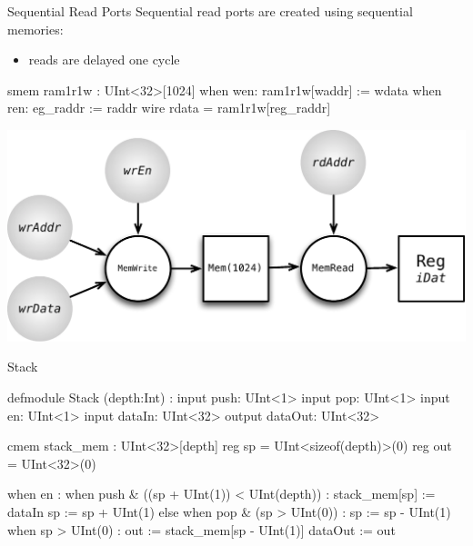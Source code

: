 \documentclass[xcolor=pdflatex,dvipsnames,table]{beamer}
\begin{document}
\begin{frame}[fragile]{Sequential Read Ports}
Sequential read ports are created using sequential memories:
\begin{itemize}
\item reads are delayed one cycle
\end{itemize}

\begin{stanza}
smem ram1r1w : UInt<32>[1024]
when wen: ram1r1w[waddr] := wdata
when ren: eg_raddr := raddr
wire rdata = ram1r1w[reg_raddr]
\end{stanza}

\begin{center}
\includegraphics[height=0.4\textheight]{figs/mem-seq-read.pdf} 
\end{center}

\end{frame}

\begin{frame}[fragile]{Stack}

{
\begin{stanza}
defmodule Stack (depth:Int) :
  input  push:    UInt<1>
  input  pop:     UInt<1>
  input  en:      UInt<1>
  input  dataIn:  UInt<32>
  output dataOut: UInt<32>

  cmem stack_mem : UInt<32>[depth]
  reg sp = UInt<sizeof(depth)>(0)
  reg out = UInt<32>(0)

  when en :
    when push & ((sp + UInt(1)) < UInt(depth)) :
      stack_mem[sp] := dataIn
      sp := sp + UInt(1)
    else when pop & (sp > UInt(0)) :
      sp := sp - UInt(1)
    when sp > UInt(0) :
      out := stack_mem[sp - UInt(1)]
  dataOut := out
\end{stanza}
}

\end{frame}
\end{document}
